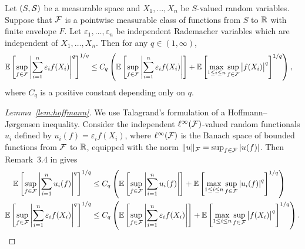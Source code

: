 \begin{lemma}
  \label{lem:hoffmann}

  Let $(S, \mathcal{S})$ be a measurable space
  and $X_1, \ldots, X_n$
  be $S$-valued random variables.
  Suppose that
  $\mathcal{F}$ is a pointwise measurable class of functions from $S$ to $\mathbb{R}$
  with finite envelope $F$.
  Let $\varepsilon_1, \ldots, \varepsilon_n$
  be independent Rademacher variables
  which are independent of $X_1, \ldots, X_n$.
  Then for any $q \in (1, \infty)$,
  \begin{align*}
    \mathbb{E} \left[
      \sup_{f \in \mathcal{F}}
      \left|
      \sum_{i=1}^n
      \varepsilon_i
      f(X_i)
      \right|
      ^q
    \right]
    ^{1/q}
    &\leq
    C_q
    \left(
      \mathbb{E} \left[
        \sup_{f \in \mathcal{F}}
        \left|
        \sum_{i=1}^n
        \varepsilon_i
        f(X_i)
        \right|
      \right]
      +
      \mathbb{E} \left[
        \max_{1 \leq i \leq n}
        \sup_{f \in \mathcal{F}}
        \big| f(X_i) \big|^q
      \right]^{1/q}
    \right),
  \end{align*}
  where $C_q$ is a positive constant depending only on $q$.

\end{lemma}

\begin{proof}[Lemma~\ref{lem:hoffmann}]

  We use Talagrand's formulation of
  a Hoffmann--J{\o}rgensen inequality.
  Consider the
  independent
  $\ell^\infty(\mathcal{F})$-valued
  random functionals $u_i$ defined by
  $u_i(f) = \varepsilon_i f(X_i)$,
  where $\ell^\infty(\mathcal{F})$
  is the Banach space of bounded functions from
  $\mathcal{F}$ to $\mathbb{R}$,
  equipped with the norm
  $\|u\|_{\mathcal{F}} = \sup_{f \in \mathcal{F}} |u(f)|$.
  Then Remark~3.4 in \citet{kwapien1991hypercontraction} gives
  \begin{align*}
    \mathbb{E} \left[
      \sup_{f \in \mathcal{F}}
      \left|
      \sum_{i=1}^n
      u_i(f)
      \right|
      ^q
    \right]
    ^{1/q}
    &\leq
    C_q
    \left(
      \mathbb{E} \left[
        \sup_{f \in \mathcal{F}}
        \left|
        \sum_{i=1}^n
        u_i(f)
        \right|
      \right]
      +
      \mathbb{E} \left[
        \max_{1 \leq i \leq n}
        \sup_{f \in \mathcal{F}}
        \left|
        u_i(f)
        \right|^q
      \right]^{1/q}
    \right) \\
    \mathbb{E} \left[
      \sup_{f \in \mathcal{F}}
      \left|
      \sum_{i=1}^n
      \varepsilon_i
      f(X_i)
      \right|
      ^q
    \right]
    ^{1/q}
    &\leq
    C_q
    \left(
      \mathbb{E} \left[
        \sup_{f \in \mathcal{F}}
        \left|
        \sum_{i=1}^n
        \varepsilon_i
        f(X_i)
        \right|
      \right]
      +
      \mathbb{E} \left[
        \max_{1 \leq i \leq n}
        \sup_{f \in \mathcal{F}}
        \big| f(X_i) \big|^q
      \right]^{1/q}
    \right).
  \end{align*}
\end{proof}

